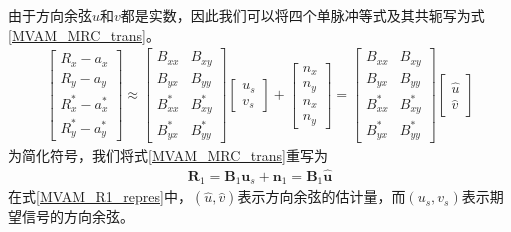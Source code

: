 \documentclass[master]{thesis-uestc}
\begin{document}
由于方向余弦$u$和$v$都是实数，因此我们可以将四个单脉冲等式及其共轭写为式\eqref{MVAM_MRC_trans}。
\begin{equation}\label{MVAM_MRC_trans}
    \begin{aligned}
        \begin{bmatrix}
            R_x - a_x \\
            R_y - a_y \\
            R_x^* - a_x^* \\
            R_y^* - a_y^* 
        \end{bmatrix} 
        \approx
        \begin{bmatrix}
            B_{xx} & B_{xy} \\
            B_{yx} & B_{yy} \\
            B_{xx}^* & B_{xy}^* \\
            B_{yx}^* & B_{yy}^*
        \end{bmatrix}
        \begin{bmatrix}
            u_s \\ v_s
        \end{bmatrix} + 
        \begin{bmatrix}
            n_x \\ n_y \\ n_x \\ n_y
        \end{bmatrix} 
        = 
        \begin{bmatrix}
            B_{xx} & B_{xy} \\
            B_{yx} & B_{yy} \\
            B_{xx}^* & B_{xy}^* \\
            B_{yx}^* & B_{yy}^*
        \end{bmatrix}
        \begin{bmatrix}
            \hat{u} \\ \hat{v}
        \end{bmatrix}
    \end{aligned}
\end{equation}
为简化符号，我们将式\eqref{MVAM_MRC_trans}重写为
\begin{equation}\label{MVAM_R1_repres}
    \begin{aligned}
        \bm{R}_1 = \bm{B}_1\bm{u}_s + \bm{n}_1 = \bm{B}_1\hat{\bm{u}}
    \end{aligned}
\end{equation}
在式\eqref{MVAM_R1_repres}中，$(\hat{u},\hat{v})$表示方向余弦的估计量，而$(u_s,v_s)$表示期望信号的方向余弦。
\end{document}
